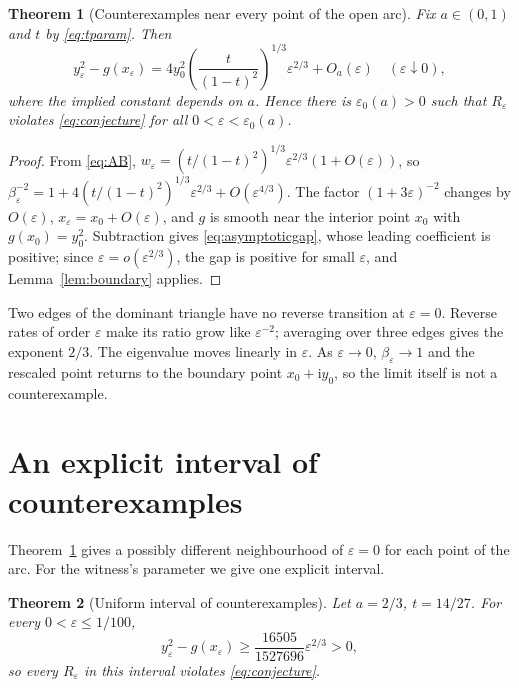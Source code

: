 \documentclass[11pt,a4paper]{article}
\numberwithin{equation}{section}
\newtheorem{theorem}{Theorem}[section]
\theoremstyle{definition}
\theoremstyle{remark}
\newcommand{\ii}{\mathrm{i}}
\newcommand{\eps}{\varepsilon}
\begin{document}
\begin{theorem}[Counterexamples near every point of the open arc]
\label{thm:family}
Fix \(a\in(0,1)\) and \(t\) by \eqref{eq:tparam}. Then
\begin{equation}
y_\eps^2-g(x_\eps)
 =4y_0^2\left(\frac{t}{(1-t)^2}\right)^{1/3}\eps^{2/3}
  +O_a(\eps)
\quad(\eps\downarrow0),
\label{eq:asymptoticgap}
\end{equation}
where the implied constant depends on \(a\). Hence there is
\(\eps_0(a)>0\) such that \(R_\eps\) violates \eqref{eq:conjecture} for
all \(0<\eps<\eps_0(a)\).
\end{theorem}

\begin{proof}
From \eqref{eq:AB},
\(w_\eps=(t/(1-t)^2)^{1/3}\eps^{2/3}(1+O(\eps))\), so
\(\beta_\eps^{-2}=1+4(t/(1-t)^2)^{1/3}\eps^{2/3}+O(\eps^{4/3})\). The
factor \((1+3\eps)^{-2}\) changes by \(O(\eps)\), \(x_\eps=x_0+O(\eps)\),
and \(g\) is smooth near the interior point \(x_0\) with
\(g(x_0)=y_0^2\). Subtraction gives \eqref{eq:asymptoticgap}, whose
leading coefficient is positive; since \(\eps=o(\eps^{2/3})\), the gap
is positive for small \(\eps\), and Lemma~\ref{lem:boundary} applies.
\end{proof}

Two edges of the dominant triangle have no reverse transition at
\(\eps=0\). Reverse rates of order \(\eps\) make its ratio grow like
\(\eps^{-2}\); averaging over three edges gives the exponent \(2/3\).
The eigenvalue moves linearly in \(\eps\). As \(\eps\to0\),
\(\beta_\eps\to1\) and the rescaled point returns to the boundary point
\(x_0+\ii y_0\), so the limit itself is not a counterexample.

\section{An explicit interval of counterexamples}
\label{sec:uniform}

Theorem~\ref{thm:family} gives a possibly different neighbourhood of
\(\eps=0\) for each point of the arc. For the witness's parameter we
give one explicit interval.

\begin{theorem}[Uniform interval of counterexamples]
\label{thm:uniform}
Let \(a=2/3\), \(t=14/27\). For every \(0<\eps\leq1/100\),
\begin{equation}
y_\eps^2-g(x_\eps)
\geq\frac{16505}{1527696}\eps^{2/3}>0,
\label{eq:uniformgap}
\end{equation}
so every \(R_\eps\) in this interval violates \eqref{eq:conjecture}.
\end{theorem}
\end{document}
